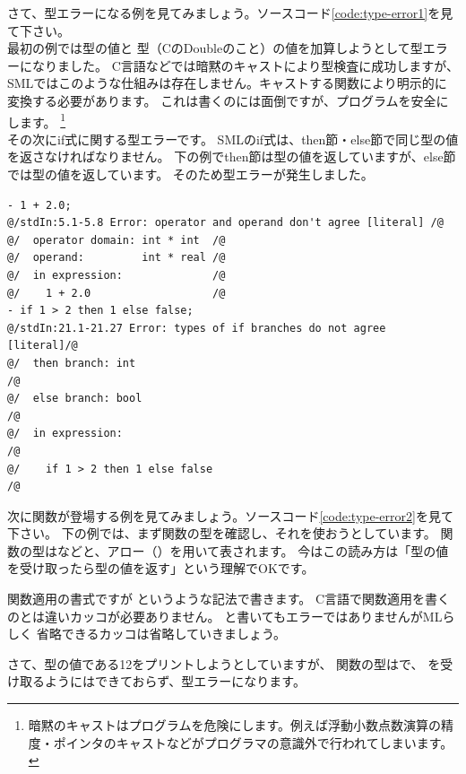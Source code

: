 \documentclass[11pt,a4paper]{article}
\begin{document}
さて、型エラーになる例を見てみましょう。ソースコード\ref{code:type-error1}を見て下さい。\\
最初の例では型の値と
型（CのDoubleのこと）の値を加算しようとして型エラーになりました。
C言語などでは暗黙のキャストにより型検査に成功しますが、
SMLではこのような仕組みは存在しません。キャストする関数により明示的に変換する必要があります。
これは書くのには面倒ですが、プログラムを安全にします。
\footnote{暗黙のキャストはプログラムを危険にします。例えば浮動小数点数演算の精度・ポインタのキャストなどがプログラマの意識外で行われてしまいます。}\\
その次にif式に関する型エラーです。
SMLのif式は、then節・else節で同じ型の値を返さなければなりません。
下の例でthen節は型の値を返していますが、else節では型の値を返しています。
そのため型エラーが発生しました。

\begin{lstlisting}[label=code:type-error1,caption=型エラー１]
- 1 + 2.0;
@/stdIn:5.1-5.8 Error: operator and operand don't agree [literal] /@
@/  operator domain: int * int  /@
@/  operand:         int * real /@
@/  in expression:              /@
@/    1 + 2.0                   /@
- if 1 > 2 then 1 else false;
@/stdIn:21.1-21.27 Error: types of if branches do not agree [literal]/@
@/  then branch: int                                                 /@
@/  else branch: bool                                                /@
@/  in expression:                                                   /@
@/    if 1 > 2 then 1 else false                                     /@
\end{lstlisting}

次に関数が登場する例を見てみましょう。ソースコード\ref{code:type-error2}を見て下さい。
下の例では、まず関数の型を確認し、それを使おうとしています。
関数の型はなどと、アロー（\prog{->}）を用いて表されます。
今はこの読み方は「型の値を受け取ったら型の値を返す」という理解でOKです。

関数適用の書式ですが  というような記法で書きます。
C言語で関数適用を書くのとは違いカッコが必要ありません。
と書いてもエラーではありませんがMLらしく
省略できるカッコは省略していきましょう。

さて、型の値である12をプリントしようとしていますが、
関数の型はで、
を受け取るようにはできておらず、型エラーになります。
\end{document}
